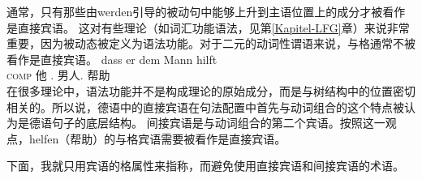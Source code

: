 通常，只有那些由werden引导的被动句中能够上升到主语位置上的成分才被看作是直接宾语。
这对有些理论（如词汇功能语法\indexlfg，见第\ref{Kapitel-LFG}章）来说非常重要，因为被动态被定义为语法功能。对于二元的动词性谓语来说，与格通常不被看作是直接宾语\citep{Cook2006a-u}。
\ea
\gll dass er dem Mann hilft\\
     \textsc{comp} 他 .\dat{} 男人.\dat{} 帮助\\
\z
在很多理论中，语法功能并不是构成理论的原始成分，而是与树结构中的位置密切相关的。所以说，德语中的直接宾语在句法配置中首先与动词组合的这个特点被认为是德语句子的底层结构。
间接宾语是与动词组合的第二个宾语。按照这一观点，helfen（帮助）的与格宾语需要被看作是直接宾语。

下面，我就只用宾语的格属性来指称，而避免使用直接宾语和间接宾语的术语。


